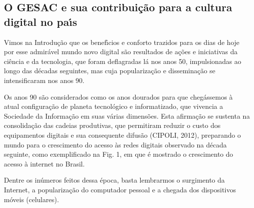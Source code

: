\documentclass[
12pt,		%
openright,	%
twoside,  %
a4paper,			%
chapter=TITLE,		%
english,			%
french,				%
spanish,			%
brazil				%
]{USPSC-classe/USPSC}
\begin{document}
\subsection[O GESAC e sua contribui\c{c}\~ao para  a cultura  digital  no pa\'{\i}s]{O GESAC e sua contribui\c{c}\~ao para  a cultura  digital  no pa\'{\i}s}\label{O GESAC e sua contribui\c{c}\~ao para  a cultura  digital  no pa\'{\i}s}
Vimos na Introdu\c{c}\~ao que os benef\'{\i}cios e conforto trazidos para os dias de hoje por esse admir\'avel mundo novo digital s\~ao resultados de a\c{c}\~oes e iniciativas da ci\^encia e da tecnologia, que foram deflagradas l\'a nos anos 50, impulsionadas ao longo das d\'ecadas seguintes, mas cuja populariza\c{c}\~ao e dissemina\c{c}\~ao se intensificaram nos anos 90.

















Os anos 90 s\~ao considerados como os anos dourados para que cheg\'assemos \`a atual configura\c{c}\~ao de planeta tecnol\'ogico e informatizado, que vivencia a Sociedade da Informa\c{c}\~ao em suas v\'arias dimens\~oes. Esta afirma\c{c}\~ao se sustenta na consolida\c{c}\~ao das cadeias produtivas, que permitiram reduzir o custo dos equipamentos digitais e sua consequente difus\~ao  (CIPOLI, 2012), preparando o mundo para o crescimento do acesso \`as redes digitais observado na d\'ecada seguinte, como exemplificado na Fig. 1, em que \'e mostrado o crescimento do acesso \`a internet no Brasil.

















Dentre os  in\'umeros feitos dessa \'epoca, basta lembrarmos o surgimento da Internet, a populariza\c{c}\~ao do computador pessoal e a chegada dos dispositivos m\'oveis (celulares).
\end{document}
